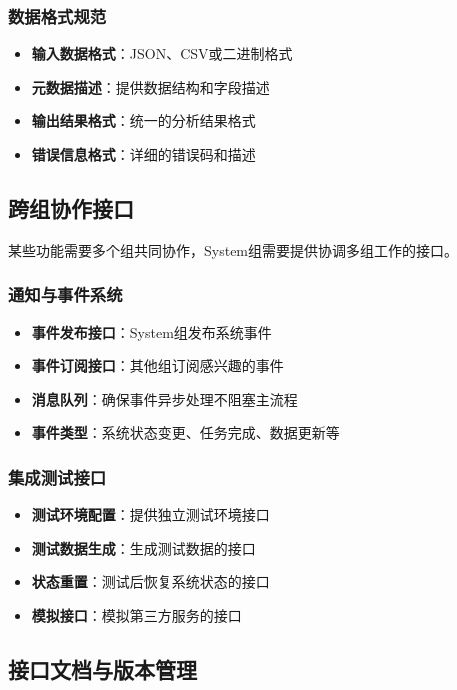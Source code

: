 \documentclass[a4paper,12pt]{article}
\begin{document}
\subsubsection{数据格式规范}

\begin{itemize}
  \item \textbf{输入数据格式}：JSON、CSV或二进制格式
  \item \textbf{元数据描述}：提供数据结构和字段描述
  \item \textbf{输出结果格式}：统一的分析结果格式
  \item \textbf{错误信息格式}：详细的错误码和描述
\end{itemize}

\subsection{跨组协作接口}

某些功能需要多个组共同协作，System组需要提供协调多组工作的接口。

\subsubsection{通知与事件系统}

\begin{itemize}
  \item \textbf{事件发布接口}：System组发布系统事件
  \item \textbf{事件订阅接口}：其他组订阅感兴趣的事件
  \item \textbf{消息队列}：确保事件异步处理不阻塞主流程
  \item \textbf{事件类型}：系统状态变更、任务完成、数据更新等
\end{itemize}

\subsubsection{集成测试接口}

\begin{itemize}
  \item \textbf{测试环境配置}：提供独立测试环境接口
  \item \textbf{测试数据生成}：生成测试数据的接口
  \item \textbf{状态重置}：测试后恢复系统状态的接口
  \item \textbf{模拟接口}：模拟第三方服务的接口
\end{itemize}

\subsection{接口文档与版本管理}
\end{document}
